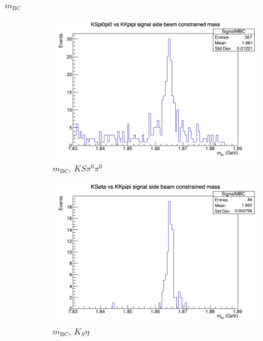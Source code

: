 \documentclass{beamer}
\begin{document}
\begin{frame}{$m_\text{BC}$}
  \begin{figure}
    \centering
    \begin{subfigure}{0.4\textwidth}
      \centering
      \includegraphics[width=\textwidth]{KSpi0pi0SignalMBC.png}
      \caption{$m_\text{BC}$, $KS\pi^0\pi^0$}
    \end{subfigure}%
    \begin{subfigure}{0.4\textwidth}
      \centering
      \includegraphics[width=\textwidth]{KSetaSignalMBC.png}
      \caption{$m_\text{BC}$, $K_S\eta$}
    \end{subfigure}
    \centering
    \begin{subfigure}{0.4\textwidth}
      \centering

\end{subfigure}
\end{figure}
\end{frame}
\end{document}
